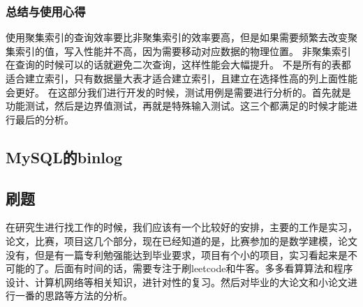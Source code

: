 \documentclass[UTF8]{ctexart}
\begin{document}
\subsubsection{总结与使用心得}
使用聚集索引的查询效率要比非聚集索引的效率要高，但是如果需要频繁去改变聚集索引的值，写入性能并不高，因为需要移动对应数据的物理位置。
非聚集索引在查询的时候可以的话就避免二次查询，这样性能会大幅提升。
不是所有的表都适合建立索引，只有数据量大表才适合建立索引，且建立在选择性高的列上面性能会更好。
在这部分我们进行开发的时候，测试用例是需要进行分析的。首先就是功能测试，然后是边界值测试，再就是特殊输入测试。这三个都满足的时候才能进行最后的分析。


\subsection{MySQL的binlog}


\subsection{刷题}
在研究生进行找工作的时候，我们应该有一个比较好的安排，主要的工作是实习，论文，比赛，项目这几个部分，现在已经知道的是，比赛参加的是数学建模，论文没有，但是有一篇专利勉强能达到毕业要求，项目有个小的项目，实习看起来是不可能的了。后面有时间的话，需要专注于刷leetcode和牛客。多多看算算法和程序设计、计算机网络等相关知识，进针对性的复习。然后对毕业的大论文和小论文进行一番的思路等方法的分析。





\end{document}

